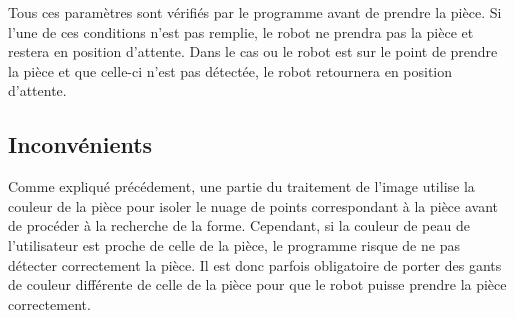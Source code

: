 Tous ces paramètres sont vérifiés par le programme avant de prendre la pièce. Si l'une de ces conditions n'est pas remplie, le robot ne prendra pas la pièce et restera en position d'attente. Dans le cas ou le robot est sur le point de prendre la pièce et que celle-ci n'est pas détectée, le robot retournera en position d'attente.

\subsection{Inconvénients}

Comme expliqué précédement, une partie du traitement de l'image utilise la couleur de la pièce pour isoler le nuage de points correspondant à la pièce avant de procéder à la recherche de la forme. Cependant, si la couleur de peau de l'utilisateur est proche de celle de la pièce, le programme risque de ne pas détecter correctement la pièce. Il est donc parfois obligatoire de porter des gants de couleur différente de celle de la pièce pour que le robot puisse prendre la pièce correctement.

